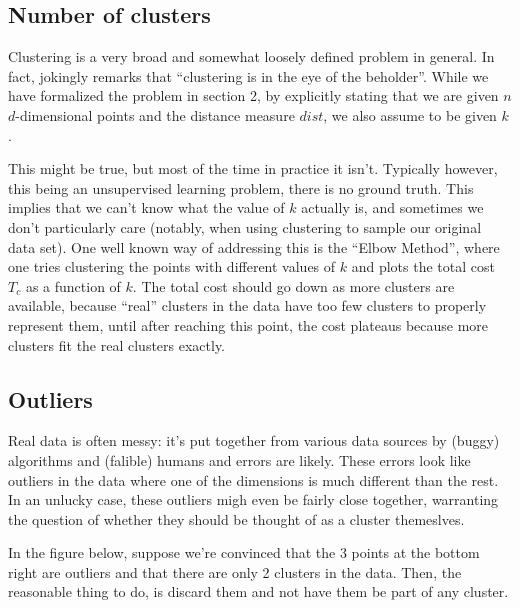 \documentclass{article}
\begin{document}
\subsection{Number of clusters}

Clustering is a very broad and somewhat loosely defined problem in general. In
fact, \cite{why} jokingly remarks that ``clustering is in the eye of the
beholder''.
While we have formalized the problem in section 2, by explicitly stating that
we are given $n$ $d$-dimensional points and the distance measure $dist$, we
also assume to be given $k$.

This might be true, but most of the time in practice it isn't. Typically
however, this being an unsupervised learning problem, there is no ground truth.
This implies that we can't know what the value of $k$ actually is, and
sometimes we don't particularly care (notably, when using clustering to sample
our original data set).
One well known way of addressing this is the ``Elbow Method'', where one tries
clustering the points with different values of $k$ and plots the total cost
$T_c$ as a function of $k$. The total cost should go down as more clusters are
available, because ``real'' clusters in the data have too few clusters to
properly represent them, until after reaching this point, the cost plateaus
because more clusters fit the real clusters exactly.

\subsection{Outliers}

Real data is often messy: it's put together from various data sources by (buggy)
algorithms and (falible) humans and errors are likely. These errors look like
outliers in the data where one of the dimensions is much different than the
rest. In an unlucky case, these outliers migh even be fairly close together,
warranting the question of whether they should be thought of as a cluster
themeslves.

In the figure below, suppose we're convinced that the 3 points at the bottom
right are outliers and that there are only 2 clusters in the data.
Then, the reasonable thing to do, is discard them and not have them be part of
any cluster.
\end{document}
